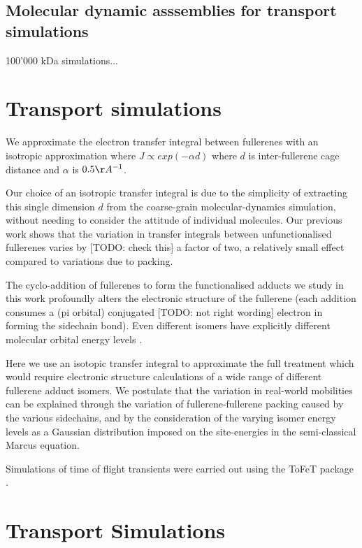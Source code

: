 \documentclass[journal=nanofd,manuscript=suppinfo]{achemso}
\begin{document}
\subsection{Molecular dynamic asssemblies for transport simulations}

100'000 kDa simulations...

\section{Transport simulations}

We approximate the electron transfer integral between fullerenes with an isotropic approximation where $J \propto exp (-\alpha d)$ where $d$ is inter-fullerene cage distance and $\alpha$ is $0.5 \AA^{-1}$.

Our choice of an isotropic transfer integral is due to the simplicity of extracting this single dimension $d$ from the coarse-grain molecular-dynamics simulation, without needing to consider the attitude of individual molecules. Our previous work\cite{kwaitowski_fullerene} shows that the variation in transfer integrals between unfunctionalised fullerenes varies by [TODO: check this] a factor of two, a relatively small effect compared to variations due to packing.

The cyclo-addition of fullerenes to form the functionalised adducts we study in this work profoundly alters the electronic structure of the fullerene (each addition consumes a (pi orbital) conjugated [TODO: not right wording] electron in forming the sidechain bond).
Even different isomers have explicitly different molecular orbital energy levels \cite{Jarvist_AM_2010}.

Here we use an isotopic transfer integral to approximate the full treatment which would require electronic structure calculations of a wide range of different fullerene adduct isomers.
We postulate that the variation in real-world mobilities can be explained through the variation of fullerene-fullerene packing caused by the various sidechains, and by the consideration of the varying isomer energy levels \cite{Jarvist_AM_2010} as a Gaussian distribution imposed on the site-energies in the semi-classical Marcus equation.


Simulations of time of flight transients were carried out using the ToFeT package \cite{ToFeT}.

\section{Transport Simulations}
\end{document}
